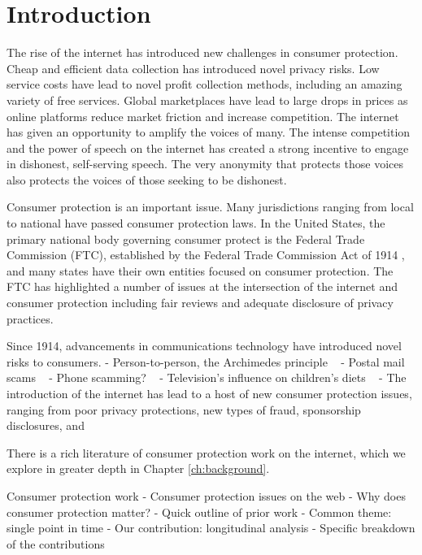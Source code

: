 \chapter{Introduction} \label{ch:introduction}

The rise of the internet has introduced new challenges in consumer protection. Cheap and efficient data collection has introduced novel privacy risks. Low service costs have lead to novel profit collection methods, including an amazing variety of free services. Global marketplaces have lead to large drops in prices as online platforms reduce market friction and increase competition. The internet has given an opportunity to amplify the voices of many. The intense competition and the power of speech on the internet has created a strong incentive to engage in dishonest, self-serving speech. The very anonymity that protects those voices also protects the voices of those seeking to be dishonest.

Consumer protection is an important issue. Many jurisdictions ranging from local to national have passed consumer protection laws. In the United States, the primary national body governing consumer protect is the Federal Trade Commission (FTC), established by the Federal Trade Commission Act of 1914 , and many states have their own entities focused on consumer protection. The FTC has highlighted a number of issues at the intersection of the internet and consumer protection including fair reviews and adequate disclosure of privacy practices.

Since 1914, advancements in communications technology have introduced novel risks to consumers. 
- Person-to-person, the Archimedes principle ~\cite{thompson2008archimedes}
- Postal mail scams ~\cite{uspismailfraud}
- Phone scamming? ~\cite{ftcphonescams}
- Television's influence on children's diets ~\cite{morton1985television}
- The introduction of the internet has lead to a host of new consumer protection issues, ranging from poor privacy protections, new types of fraud, sponsorship disclosures, and 

There is a rich literature of consumer protection work on the internet, which we explore in greater depth in Chapter \ref{ch:background}.

Consumer protection work
- Consumer protection issues on the web
- Why does consumer protection matter?
- Quick outline of prior work
- Common theme: single point in time
- Our contribution: longitudinal analysis
- Specific breakdown of the contributions

